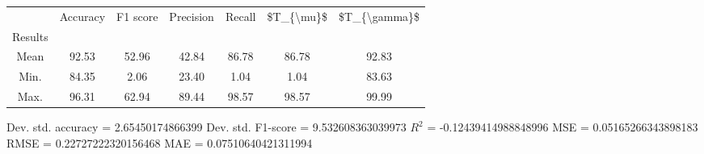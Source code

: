 \begin{tabular}{|c|c|c|c|c|c|c|}
\toprule
{} &  Accuracy &  F1 score &  Precision &  Recall &  \$T\_\{\textbackslash mu\}\$ &  \$T\_\{\textbackslash gamma\}\$ \\
Results &           &           &            &         &            &               \\
\hline
Mean    &     92.53 &     52.96 &      42.84 &   86.78 &      86.78 &         92.83 \\
Min.    &     84.35 &      2.06 &      23.40 &    1.04 &       1.04 &         83.63 \\
Max.    &     96.31 &     62.94 &      89.44 &   98.57 &      98.57 &         99.99 \\
\bottomrule
\end{tabular}

 Dev. std. accuracy = 2.65450174866399
 Dev. std. F1-score = 9.532608363039973
 $R^2$ = -0.12439414988848996
 MSE = 0.05165266343898183
 RMSE = 0.22727222320156468
 MAE = 0.07510640421311994